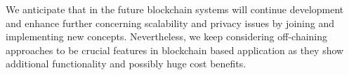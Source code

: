 We anticipate that in the future blockchain systems will continue development and enhance further concerning scalability and privacy issues by joining and implementing new concepts. Nevertheless, we keep considering off-chaining approaches to be crucial features in blockchain based application as they show additional functionality and possibly huge cost benefits.
